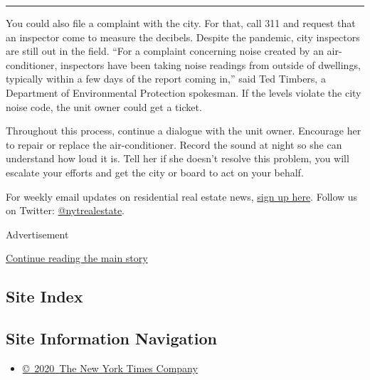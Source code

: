 \begin{center}\rule{0.5\linewidth}{\linethickness}\end{center}

You could also file a complaint with the city. For that, call 311 and
request that an inspector come to measure the decibels. Despite the
pandemic, city inspectors are still out in the field. ``For a complaint
concerning noise created by an air-conditioner, inspectors have been
taking noise readings from outside of dwellings, typically within a few
days of the report coming in,'' said Ted Timbers, a Department of
Environmental Protection spokesman. If the levels violate the city noise
code, the unit owner could get a ticket.

Throughout this process, continue a dialogue with the unit owner.
Encourage her to repair or replace the air-conditioner. Record the sound
at night so she can understand how loud it is. Tell her if she doesn't
resolve this problem, you will escalate your efforts and get the city or
board to act on your behalf.

For weekly email updates on residential real estate news,
\href{http://www.nytimes3xbfgragh.onion/newsletters/realestate/}{sign up
here}. Follow us on Twitter:
\href{https://twitter.com/nytrealestate}{@nytrealestate}.

Advertisement

\protect\hyperlink{after-bottom}{Continue reading the main story}

\hypertarget{site-index}{%
\subsection{Site Index}\label{site-index}}

\hypertarget{site-information-navigation}{%
\subsection{Site Information
Navigation}\label{site-information-navigation}}

\begin{itemize}
\tightlist
\item
  \href{https://help.nytimes3xbfgragh.onion/hc/en-us/articles/115014792127-Copyright-notice}{©~2020~The
  New York Times Company}
\end{itemize}

